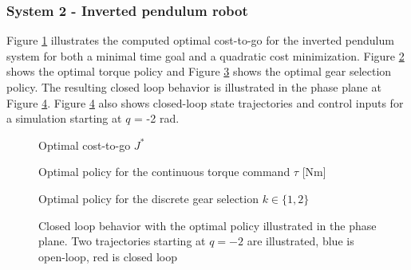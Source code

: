\subsubsection{System 2 - Inverted pendulum robot}
%
Figure \ref{fig:J2} illustrates the computed optimal cost-to-go for the inverted pendulum system for both a minimal time goal and a quadratic cost minimization. Figure \ref{fig:u02} shows the optimal torque policy and Figure \ref{fig:u12} shows the optimal gear selection policy. The resulting closed loop behavior is illustrated in the phase plane at Figure \ref{fig:phase_plane2}. Figure \ref{fig:phase_plane2} also shows closed-loop state trajectories and control inputs for a simulation starting at $q$ = -2 rad.

\begin{figure}[p]
        \centering
        \caption[Optimal cost-to-go]{Optimal cost-to-go $J^*$}\label{fig:J2}
\end{figure}

\begin{figure}[p]
        \centering
        \caption[Optimal policy for the continuous torque command]{Optimal policy for the continuous torque command $\tau$ [Nm]}\label{fig:u02}
\end{figure}

\begin{figure}[p]
        \centering
        \caption[Optimal policy for the discrete gear selection]{Optimal policy for the discrete gear selection $k \in \{1,2\}$}\label{fig:u12}
\end{figure}

\begin{figure}[p]
        \centering
        \caption[Closed loop behavior in the phase plane]{Closed loop behavior with the optimal policy illustrated in the phase plane. Two trajectories starting at $q=-2$ are illustrated, blue is open-loop, red is closed loop}\label{fig:phase_plane2}
\end{figure}

